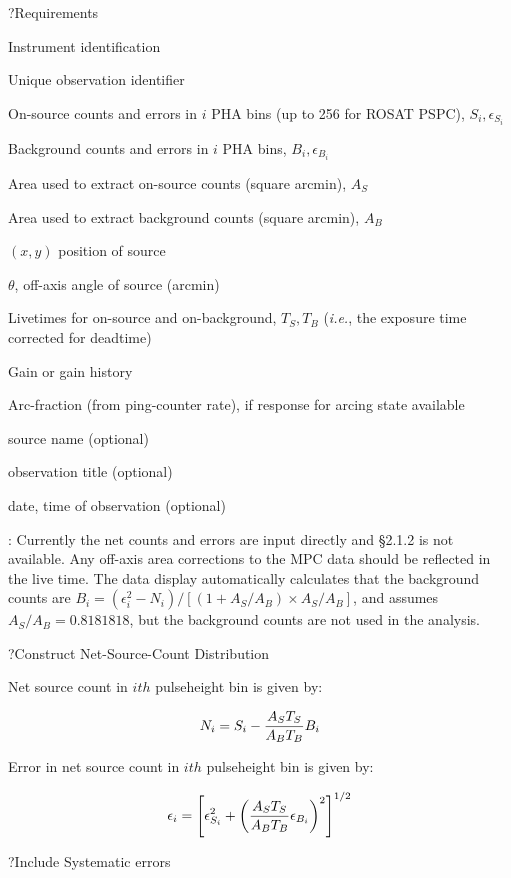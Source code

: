 \??Requirements

{\listlist
Instrument identification

Unique observation identifier

On-source counts and errors in $i$ PHA bins (up to 256 for ROSAT
PSPC), $S_i, \epsilon_{S_i}$

Background counts and errors in $i$ PHA bins, $B_i, \epsilon_{B_i}$

Area used to extract on-source counts (square arcmin), $A_S$

Area used to extract background counts (square arcmin), $A_B$

$(x,y)$ position of source

$\theta$, off-axis angle of source (arcmin)

Livetimes for on-source and on-background, $T_S, T_B$ ({\it i.e.}, the
exposure time corrected for deadtime)

Gain or gain history

Arc-fraction (from ping-counter rate), if response for arcing state available

source name (optional)

observation title (optional)

date, time of observation (optional)

: Currently the net counts and errors are input
directly and \S 2.1.2 is not available. Any off-axis
area corrections to the MPC data should be reflected in the live time.
The data display automatically calculates that the background counts
are $B_i = (\epsilon_i^2 - N_i) / [ ( 1 + A_S/A_B) \times A_S/A_B]$,
and assumes $A_S/A_B = 0.8181818$, but the background counts are not
used in the analysis.

}

\??Construct Net-Source-Count Distribution

{\listlist

Net source count in $ith$ pulseheight bin is given by:

}

$$N_i = S_i - {A_S T_S \over A_B T_B} B_i$$

{\listlist

Error in net source count in $ith$ pulseheight bin is given by:

}

$$\epsilon_i = \left[ \epsilon_{S_i}^2 + 
\left({A_S T_S \over A_B T_B} \epsilon_{B_i} \right)^2
\right]^{1/2}$$

\??Include Systematic errors

